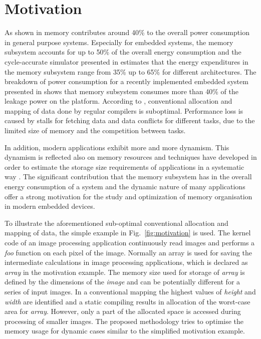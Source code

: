 \documentclass[a4paper,conference]{IEEEtran}
\begin{document}
\section{Motivation}
\label{sec:motivation}

As shown in \cite{Gonzalez1996} memory contributes around 40\% to the overall power consumption in general purpose systems. Especially for embedded systems, the memory subsystem accounts for up to 50\% of the overall energy consumption \cite{Che09} and the cycle-accurate simulator presented in \cite{Ben99} estimates that the energy expenditures in the memory subsystem range from 35\% up to 65\% for different architectures. The breakdown of power consumption for a recently implemented embedded system presented in \cite{Hul11} shows that memory subsystem consumes more than 40\% of the leakage power on the platform. According to \cite{tcm}, conventional allocation and mapping of data done by regular compilers is suboptimal. Performance loss is caused by stalls for fetching data and data conflicts for different tasks, due to the limited size of memory and the competition between tasks. 

In addition, modern applications exhibit more and more dynamism. This dynamism is reflected also on memory resources and techniques have developed in order to estimate the storage size requirements of applications in a systematic way \cite{Ang13}. The significant contribution that the memory subsystem has in the overall energy consumption of a system and the dynamic nature of many applications offer a strong motivation for the study and optimization of memory organisation in modern embedded devices.

To illustrate the aforementioned sub-optimal conventional allocation and mapping of data, the simple example in Fig.~\ref{fig:motivation} is used. The kernel code of an image processing application continuously read images and performs a \textit{foo} function on each pixel of the image. Normally an array is used for saving the intermediate calculations in image processing applications, which is declared as \textit{array} in the motivation example. The memory size used for storage of \textit{array}  is defined by the dimensions of the \textit{image} and can be potentially different for a series of input images. In a conventional mapping the highest values of \textit{height} and \textit{width} are identified and a static compiling results in allocation of the worst-case area for \textit{array}. However, only a part of the allocated space is accessed during processing of smaller images. The proposed methodology tries to optimise the memory usage for dynamic cases similar to the simplified motivation example.
\end{document}

